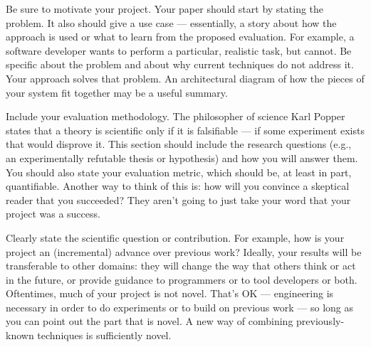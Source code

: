 



Be sure to motivate your project. Your paper should start by stating the problem. It also should give a use case — essentially, a story about how the approach is used or what to learn from the proposed evaluation. For example, a software developer wants to perform a particular, realistic task, but cannot. Be specific about the problem and about why current techniques do not address it. Your approach solves that problem. An architectural diagram of how the pieces of your system fit together may be a useful summary.

Include your evaluation methodology. The philosopher of science Karl Popper states that a theory is scientific only if it is falsifiable — if some experiment exists that would disprove it. This section should include the research questions (e.g., an experimentally refutable thesis or hypothesis) and how you will answer them. You should also state your evaluation metric, which should be, at least in part, quantifiable. Another way to think of this is: how will you convince a skeptical reader that you succeeded? They aren't going to just take your word that your project was a success.

Clearly state the scientific question or contribution. For example, how is your project an (incremental) advance over previous work? Ideally, your results will be transferable to other domains: they will change the way that others think or act in the future, or provide guidance to programmers or to tool developers or both. Oftentimes, much of your project is not novel. That's OK — engineering is necessary in order to do experiments or to build on previous work — so long as you can point out the part that is novel. A new way of combining previously-known techniques is sufficiently novel. 